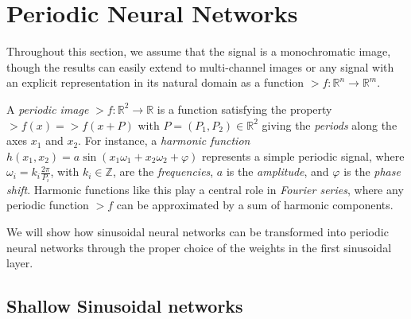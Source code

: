 \section{Periodic Neural Networks}

Throughout this section, we assume that the signal is a monochromatic image, though the results can easily extend to multi-channel images or any signal with an explicit representation in its natural domain as a function \( \gt{f}: \mathbb{R}^n \to \mathbb{R}^m \).

A \textit{periodic image} $\gt{f}:\mathbb{R}^2\to \mathbb{R}$ is a function satisfying the property $\gt{f}(x) \!=\! \gt{f}(x + P)$ with $P=(P_1, P_2)\in \mathbb{R}^2$ giving the \textit{periods} along the axes $x_1$ and $x_2$.
For instance, a \textit{harmonic function} $h(x_1, x_2)=a\sin(x_1\omega_1+x_2\omega_2+ \varphi)$ represents a simple periodic signal, where $\omega_i\!=\!k_i\frac{2\pi}{P_i}$, with \( k_i \in \mathbb{Z} \), are the \textit{frequencies}, $a$ is the \textit{amplitude}, and $\varphi$ is the \textit{phase shift}.
Harmonic functions like this play a central role in \textit{Fourier series}, where any periodic function $\gt{f}$ can be approximated by a sum of harmonic components.

We will show how sinusoidal neural networks can be transformed into periodic neural networks through the proper choice of the weights in the first sinusoidal layer.




\subsection{Shallow Sinusoidal networks}

